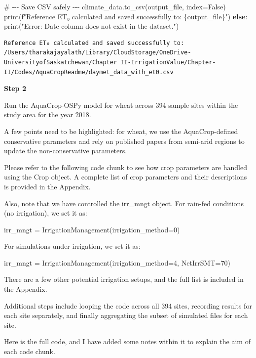 \documentclass[
  letterpaper,
  DIV=11,
  numbers=noendperiod]{scrartcl}
\newenvironment{Shaded}{\begin{snugshade}}{\end{snugshade}}
\newcommand{\BuiltInTok}[1]{\textcolor[rgb]{0.00,0.23,0.31}{#1}}
\newcommand{\CommentTok}[1]{\textcolor[rgb]{0.37,0.37,0.37}{#1}}
\newcommand{\ControlFlowTok}[1]{\textcolor[rgb]{0.00,0.23,0.31}{\textbf{#1}}}
\newcommand{\NormalTok}[1]{\textcolor[rgb]{0.00,0.23,0.31}{#1}}
\newcommand{\OperatorTok}[1]{\textcolor[rgb]{0.37,0.37,0.37}{#1}}
\newcommand{\SpecialCharTok}[1]{\textcolor[rgb]{0.37,0.37,0.37}{#1}}
\newcommand{\SpecialStringTok}[1]{\textcolor[rgb]{0.13,0.47,0.30}{#1}}
\newcommand{\StringTok}[1]{\textcolor[rgb]{0.13,0.47,0.30}{#1}}
\newcommand{\VariableTok}[1]{\textcolor[rgb]{0.07,0.07,0.07}{#1}}
\begin{document}
\begin{Shaded}
\begin{Highlighting}[]
    \CommentTok{\# {-}{-}{-} Save CSV safely {-}{-}{-}}
\NormalTok{    climate\_data.to\_csv(output\_file, index}\OperatorTok{=}\VariableTok{False}\NormalTok{)}
    \BuiltInTok{print}\NormalTok{(}\SpecialStringTok{f"Reference ET₀ calculated and saved successfully to: }\SpecialCharTok{\{}\NormalTok{output\_file}\SpecialCharTok{\}}\SpecialStringTok{"}\NormalTok{)}
\ControlFlowTok{else}\NormalTok{:}
    \BuiltInTok{print}\NormalTok{(}\StringTok{"Error: \textquotesingle{}Date\textquotesingle{} column does not exist in the dataset."}\NormalTok{)}
\end{Highlighting}
\end{Shaded}

\begin{verbatim}
Reference ET₀ calculated and saved successfully to: /Users/tharakajayalath/Library/CloudStorage/OneDrive-UniversityofSaskatchewan/Chapter II-IrrigationValue/Chapter-II/Codes/AquaCropReadme/daymet_data_with_et0.csv
\end{verbatim}

\textbf{Step 2}

Run the AquaCrop-OSPy model for wheat across 394 sample sites within the
study area for the year 2018.

A few points need to be highlighted: for wheat, we use the
AquaCrop-defined conservative parameters and rely on published papers
from semi-arid regions to update the non-conservative parameters.

Please refer to the following code chunk to see how crop parameters are
handled using the Crop object. A complete list of crop parameters and
their descriptions is provided in the Appendix.

Also, note that we have controlled the irr\_mngt object. For rain-fed
conditions (no irrigation), we set it as:

irr\_mngt = IrrigationManagement(irrigation\_method=0)

For simulations under irrigation, we set it as:

irr\_mngt = IrrigationManagement(irrigation\_method=4, NetIrrSMT=70)

There are a few other potential irrigation setups, and the full list is
included in the Appendix.

Additional steps include looping the code across all 394 sites,
recording results for each site separately, and finally aggregating the
subset of simulated files for each site.

Here is the full code, and I have added some notes within it to explain
the aim of each code chunk.
\end{document}
